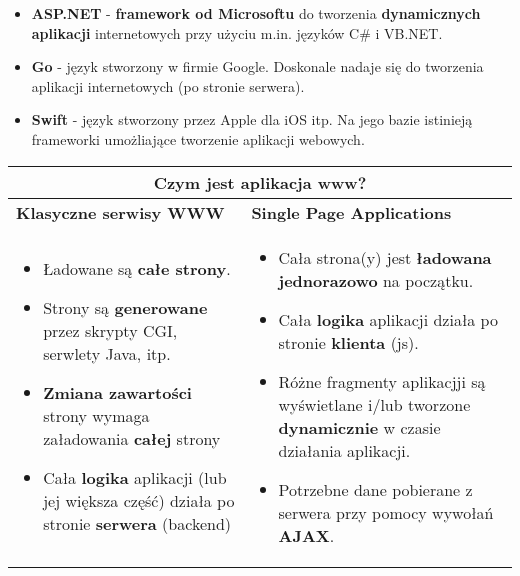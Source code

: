 \documentclass[../main.tex]{subfiles}
\begin{document}
\begin{itemize}
\begin{itemize}
            \item \textbf{ASP.NET} - \textbf{framework od Microsoftu} do tworzenia \textbf{dynamicznych aplikacji} internetowych przy użyciu m.in. języków C\# i VB.NET.
            \item \textbf{Go} - język stworzony w firmie Google. Doskonale nadaje się do tworzenia aplikacji internetowych (po stronie serwera).
            \item \textbf{Swift} - język stworzony przez Apple dla iOS itp. Na jego bazie istinieją frameworki umożliające tworzenie aplikacji webowych.
        \end{itemize}
    \end{itemize}

    \begin{table}[H]
        \begin{center}
            \begin{tabular}{|p{7.5cm}|p{8.5cm}|}
                \hline
                \multicolumn{2}{|c|}{\textbf{Czym jest aplikacja www?}} \\
                \hline
                \textbf{Klasyczne serwisy WWW} & \textbf{Single Page Applications} \\
                \hline
                \hline
                \begin{itemize}
                    \item Ładowane są \textbf{całe strony}.
                    \item Strony są \textbf{generowane} przez skrypty CGI, serwlety Java, itp.
                    \item \textbf{Zmiana zawartości} strony wymaga załadowania \textbf{całej} strony
                    \item Cała \textbf{logika} aplikacji (lub jej większa część) działa po stronie \textbf{serwera} (backend)
                \end{itemize}
                &
                \begin{itemize}
                    \item Cała strona(y) jest \textbf{ładowana jednorazowo} na początku.
                    \item Cała \textbf{logika} aplikacji działa po stronie \textbf{klienta} (js).
                    \item Różne fragmenty aplikacjji są wyświetlane i/lub tworzone \textbf{dynamicznie} w czasie działania aplikacji.
                    \item Potrzebne dane pobierane z serwera przy pomocy wywołań \textbf{AJAX}.
                \end{itemize} \\
                \hline
            \end{tabular}
        \end{center}
    \end{table}
\end{document}
